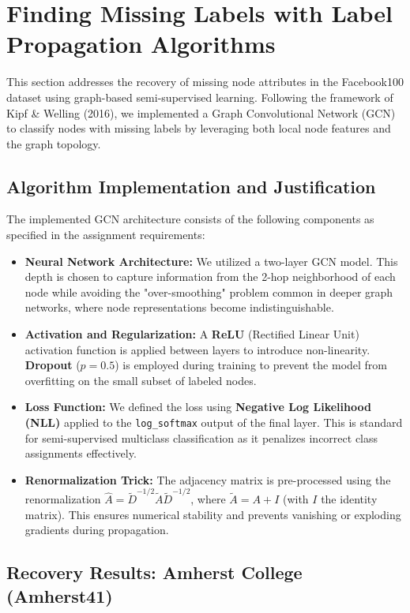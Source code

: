 \documentclass[12pt]{article}
\begin{document}
\section{Finding Missing Labels with Label Propagation Algorithms}

This section addresses the recovery of missing node attributes in the Facebook100 dataset using graph-based semi-supervised learning. Following the framework of Kipf \& Welling (2016), we implemented a Graph Convolutional Network (GCN) to classify nodes with missing labels by leveraging both local node features and the graph topology.

\subsection*{Algorithm Implementation and Justification}

The implemented GCN architecture consists of the following components as specified in the assignment requirements:

\begin{itemize}
    \item \textbf{Neural Network Architecture:} We utilized a two-layer GCN model. This depth is chosen to capture information from the 2-hop neighborhood of each node while avoiding the "over-smoothing" problem common in deeper graph networks, where node representations become indistinguishable.
    \item \textbf{Activation and Regularization:} A \textbf{ReLU} (Rectified Linear Unit) activation function is applied between layers to introduce non-linearity. \textbf{Dropout} ($p=0.5$) is employed during training to prevent the model from overfitting on the small subset of labeled nodes.
    \item \textbf{Loss Function:} We defined the loss using \textbf{Negative Log Likelihood (NLL)} applied to the \texttt{log\_softmax} output of the final layer. This is standard for semi-supervised multiclass classification as it penalizes incorrect class assignments effectively.
    \item \textbf{Renormalization Trick:} The adjacency matrix is pre-processed using the renormalization $\hat{A} = \tilde{D}^{-1/2} \tilde{A} \tilde{D}^{-1/2}$, where $\tilde{A} = A + I$ (with $I$ the identity matrix). This ensures numerical stability and prevents vanishing or exploding gradients during propagation.
\end{itemize}

\subsection*{Recovery Results: Amherst College (Amherst41)}
\end{document}
